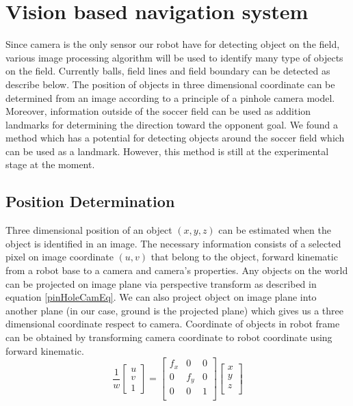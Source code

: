 \section{Vision based navigation system}
Since camera is the only sensor our robot have for detecting object on the field, various image processing algorithm will be used to identify many type of objects on the field. Currently balls, field lines and field boundary can be detected as describe below. The position of objects in three dimensional coordinate can be determined from an image according to a principle of a pinhole camera model. Moreover, information outside of the soccer field can be used as addition landmarks for determining the direction toward the opponent goal. We found a method which has a potential for detecting objects around the soccer field which can be used as a landmark. However, this method is still at the experimental stage at the moment. 

	\subsection{Position Determination}
	\label{threeToTwo}
	Three dimensional position of an object $(x,y,z)$ can be estimated when the object is identified in an image. The necessary information consists of a selected pixel on image coordinate $(u,v)$ that belong to the object, forward kinematic from a robot base to a camera and camera's properties. Any objects on the world can be projected on image plane via perspective transform as described in equation \ref{pinHoleCamEq}. We can also project object on image plane into another plane (in our case, ground is the projected plane) which gives us a three dimensional coordinate respect to camera. Coordinate of objects in robot frame can be obtained by transforming camera coordinate to robot coordinate using forward kinematic.
	\begin{equation}
		\label{pinHoleCamEq}
		\frac{1}{w}
		\begin{bmatrix}
		u \\
		v \\
		1 
		\end{bmatrix} =
		\begin{bmatrix}
			f_{x}	&	0	&	0\\
			0		&	f_{y} & 0\\
			0		&	0	&	1\\	
		\end{bmatrix}
		\begin{bmatrix}
			x \\
			y \\
			z \\
		\end{bmatrix}
	\end{equation}
	
